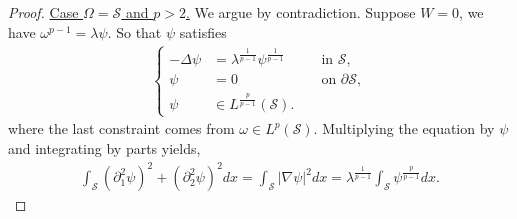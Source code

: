 \documentclass[11pt,letterpaper]{amsart}
\theoremstyle{definition}
\theoremstyle{remark}
\renewcommand{\S}{\mathcal{S}}
\newcommand{\p}{\partial}
\renewcommand{\tt}[1]{\text{#1}}
\numberwithin{equation}{section}
\begin{document}
\begin{proof}
    \underline{Case $\Omega=\S$ and $p>2$.} We argue by contradiction. Suppose $W=0$, we have $\omega^{p-1}=\lambda \psi$. So that $\psi$ satisfies
    \begin{align*}
        \left\{\begin{aligned}
            -\Delta\psi & =\lambda^{\frac{1}{p-1}}\psi^{\frac{1}{p-1}} && \tt{ in } \S, \\
            \psi & =0 && \tt{ on } \p\S, \\
            \psi & \in L^{\frac{p}{p-1}}(\S).
        \end{aligned}\right.
    \end{align*}
    where the last constraint comes from $\omega\in L^p(\S)$. Multiplying the equation by $\psi$ and integrating by parts yields,
    \begin{align}
        \int_{\S}(\p_1^2 \psi)^2+ (\p_2^2 \psi)^2 dx = \int_{\S}|\nabla \psi|^2 dx = \lambda^{\frac{1}{p-1}}\int_{\S}\psi^{\frac{p}{p-1}} dx. \label{eqn:identity 1 in proof W>0 on S}
    \end{align}


\end{proof}
\end{document}
